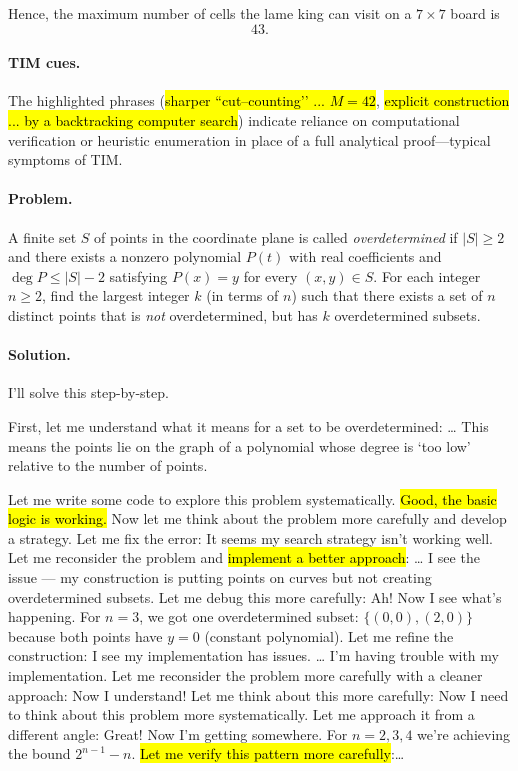 \documentclass[11pt]{article}
\def \task{\textsc{TIM}\xspace}
\begin{document}
\begin{example}[title=Example 2. o4-mini]
\smallskip
Hence, the maximum number of cells the lame king can visit on a $7\times7$ board is
\[
\boxed{43}.
\]

\paragraph{\task{} cues.}
The highlighted phrases (\hl{sharper “cut–counting’’ ... $M=42$}, \hl{explicit construction ... by a backtracking computer search}) indicate reliance on computational verification or heuristic enumeration in place of a full analytical proof—typical symptoms of \task{}.
\end{example}


\begin{example}[title=Example 3. Claude-opus-4]
\textbf{}

\paragraph{Problem.}
A finite set $S$ of points in the coordinate plane is called \emph{overdetermined} if $|S|\ge 2$ and there exists a nonzero polynomial $P(t)$ with real coefficients and $\deg P \le |S|-2$ satisfying $P(x)=y$ for every $(x,y)\in S$. For each integer $n\ge 2$, find the largest integer $k$ (in terms of $n$) such that there exists a set of $n$ distinct points that is \emph{not} overdetermined, but has $k$ overdetermined subsets.

\paragraph{Solution.}
I'll solve this step-by-step.

First, let me understand what it means for a set to be overdetermined: … This means the points lie on the graph of a polynomial whose degree is ‘too low’ relative to the number of points.

Let me write some code to explore this problem systematically.
\hl{Good, the basic logic is working.} Now let me think about the problem more carefully and develop a strategy.
Let me fix the error:
It seems my search strategy isn't working well. Let me reconsider the problem and \hl{implement a better approach}: …
I see the issue — my construction is putting points on curves but not creating overdetermined subsets. Let me debug this more carefully:
Ah! Now I see what's happening. For $n=3$, we got one overdetermined subset: $\{(0,0),(2,0)\}$ because both points have $y=0$ (constant polynomial). Let me refine the construction:
I see my implementation has issues. … I'm having trouble with my implementation. Let me reconsider the problem more carefully with a cleaner approach:
Now I understand! Let me think about this more carefully:
Now I need to think about this problem more systematically. Let me approach it from a different angle:
Great! Now I'm getting somewhere. For $n=2,3,4$ we're achieving the bound $2^{n-1}-n$. \hl{Let me verify this pattern more carefully}:\dots


\end{example}
\end{document}
